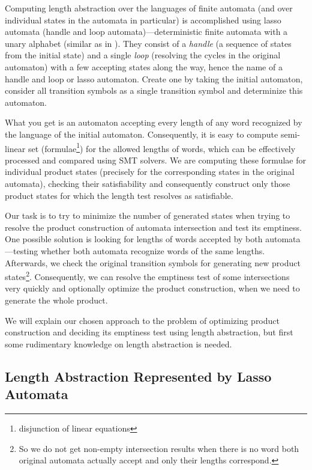 Computing length abstraction over the languages of finite automata (and over individual states in the automata in particular) is accomplished using lasso automata (handle and loop automata)---deterministic finite automata with a unary alphabet (similar as in \cite{DBLP:conf/cav/AbdullaACHRRS14}). They consist of a \emph{handle} (a sequence of states from the initial state) and a single \emph{loop} (resolving the cycles in the original automaton) with a few accepting states along the way, hence the name of a handle and loop or lasso automaton. Create one by taking the initial automaton, consider all transition symbols as a single transition symbol and determinize this automaton.

What you get is an automaton accepting every length of any word recognized by the language of the initial automaton. Consequently, it is easy to compute semi-linear set (formulae\footnote{disjunction of linear equations}) for the allowed lengths of words, which can be effectively processed and compared using SMT solvers. We are computing these formulae for individual product states (precisely for the corresponding states in the original automata), checking their satisfiability and consequently construct only those product states for which the length test resolves as satisfiable.

Our task is to try to minimize the number of generated states when trying to resolve the product construction of automata intersection and test its emptiness. One possible solution is looking for lengths of words accepted by both automata---testing whether both automata recognize words of the same lengths. Afterwards, we check the original transition symbols for generating new product states\footnote{So we do not get non-empty intersection results when there is no word both original automata actually accept and only their lengths correspond.}. Consequently, we can resolve the emptiness test of some intersections very quickly and optionally optimize the product construction, when we need to generate the whole product.

We will explain our chosen approach to the problem of optimizing product construction and deciding its emptiness test using length abstraction, but first some rudimentary knowledge on length abstraction is needed.

\subsection{Length Abstraction Represented by Lasso Automata} \label{sec:length_abstraction}

